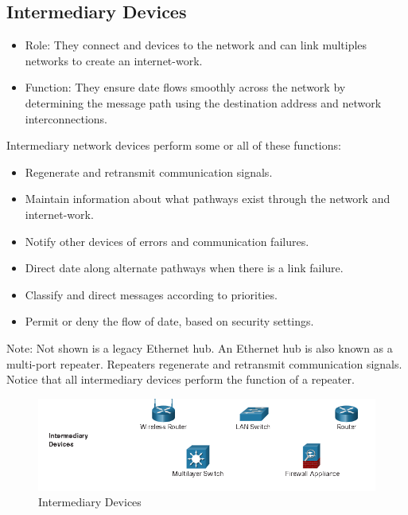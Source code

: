 \documentclass[a4paper,11pt]{article}
\begin{document}
\subsection{Intermediary Devices}
\begin{itemize}
    \item Role: They connect and devices to the network and can link multiples networks to create an internet-work.\\
    \item Function: They ensure date flows  smoothly across the network by determining the message path using the destination address and network interconnections.\\
\end{itemize}
\begin{tcolorbox}[colframe=gray!80, colback=gray!20, coltitle=black, title= Peer-to-Peer]
     Intermediary network devices perform some or all of these functions:
    \begin{itemize}
        \item Regenerate and retransmit communication signals.\\
        \item Maintain information about what pathways exist through the network and internet-work.\\
        \item  Notify other devices of errors and communication failures.\\
        \item Direct date along alternate pathways when there is a link failure.\\
        \item Classify and direct messages according to priorities.\\        \item Permit or deny the flow of date, based on security settings.\\
    \end{itemize}
    Note: Not shown is a legacy Ethernet hub. An Ethernet hub is also known as a multi-port repeater. Repeaters regenerate and retransmit communication signals. Notice that all intermediary devices perform the function of a repeater.\\
\end{tcolorbox}

\begin{figure}[h!]
    \centering
    \includegraphics[width=\textwidth]{1.png}
    \caption{Intermediary Devices}
    \label{fig:cap1}
\end{figure}
\end{document}
